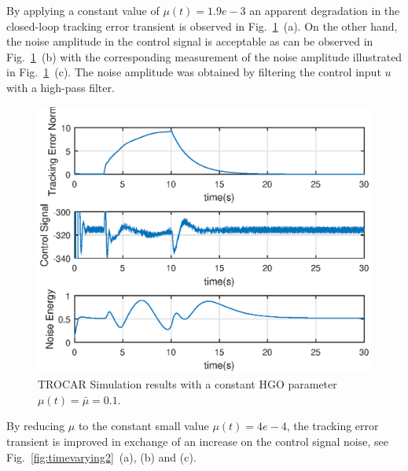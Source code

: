 \documentclass[letterpaper, 10 pt, journal, twocolumn]{IEEEtran}  %
\theoremstyle{plain}
\theoremstyle{definition}
\theoremstyle{remark}
\begin{document}
By applying a constant value of $\mu(t)= 1.9e-3$ an apparent degradation in the closed-loop tracking error transient is observed in Fig.~\ref{fig:timevarying1}~(a). On the other hand, the noise amplitude in the control signal is acceptable as can be observed in Fig.~\ref{fig:timevarying1}~(b) with the corresponding measurement of the noise amplitude illustrated in Fig.~\ref{fig:timevarying1}~(c). The noise amplitude was obtained by filtering the control input $u$ with a high-pass filter. 
%
\begin{figure}[h!]
\begin{center}
\includegraphics[width = 13cm]{Figs/mu0dot1-30sec.eps}
\caption{TROCAR Simulation results with a constant HGO parameter $\mu(t)=\bar{\mu}\!=\!0.1$.}
\label{fig:timevarying1}
\end{center}
\end{figure}
%
By reducing $\mu$ to the constant small value $\mu(t)=4e-4$, the  tracking error transient is improved in exchange of an increase on the control signal noise, see  Fig.~\ref{fig:timevarying2}~(a), (b) and (c).
%
\end{document}
